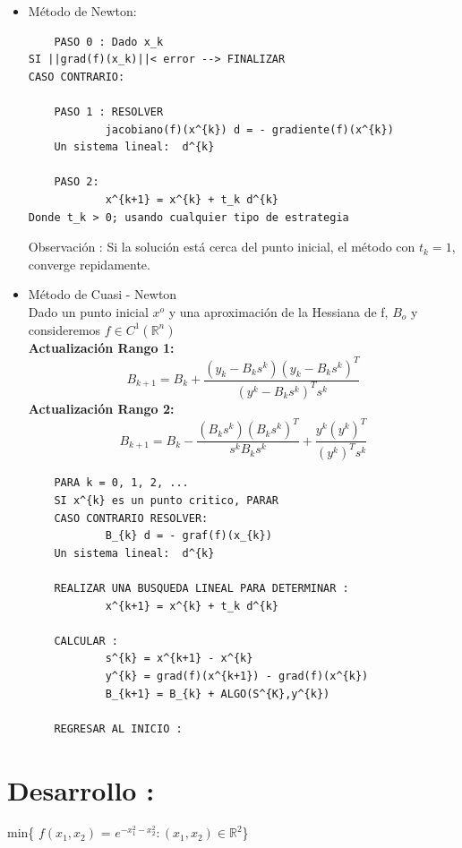 \documentclass[11pt]{article}
\begin{document}
\begin{itemize}
\item Método de Newton:

\begin{lstlisting}
    PASO 0 : Dado x_k
SI ||grad(f)(x_k)||< error --> FINALIZAR
CASO CONTRARIO:  

    PASO 1 : RESOLVER
            jacobiano(f)(x^{k}) d = - gradiente(f)(x^{k})
    Un sistema lineal:  d^{k}

    PASO 2: 
            x^{k+1} = x^{k} + t_k d^{k}
Donde t_k > 0; usando cualquier tipo de estrategia 
\end{lstlisting}
Observación : Si la solución está cerca del punto inicial, el método con $t_k = 1$, converge repidamente.

\item Método de Cuasi - Newton\\
Dado un punto inicial $x^o$ y una aproximación de la Hessiana de f, $B_o$ y consideremos $f \in C^{1}(\mathbb{R}^n)$ \\
\textbf{Actualización Rango 1:}
\[ B_{k+1} = B_{k} + \dfrac{(y_k - B_k s^k)(y_k - B_k s^k)^T}{(y^k - B_k s^k)^T s^k} \]
\textbf{Actualización Rango 2:}
\[ B_{k+1} = B_k - \dfrac{(B_k s^k)(B_k s^k)^T}{s^k B_k s^k} + \dfrac{y^k (y^k)^T}{(y^k)^T s^k}\]
\begin{lstlisting}
    PARA k = 0, 1, 2, ...
    SI x^{k} es un punto critico, PARAR
    CASO CONTRARIO RESOLVER:
            B_{k} d = - graf(f)(x_{k})
    Un sistema lineal:  d^{k}

    REALIZAR UNA BUSQUEDA LINEAL PARA DETERMINAR :
            x^{k+1} = x^{k} + t_k d^{k}

    CALCULAR : 
            s^{k} = x^{k+1} - x^{k}
            y^{k} = grad(f)(x^{k+1}) - grad(f)(x^{k})
            B_{k+1} = B_{k} + ALGO(S^{K},y^{k})

    REGRESAR AL INICIO : 
\end{lstlisting}



\end{itemize}

\section*{Desarrollo : }
\begin{center}
    min\{ $f(x_1,x_2)$ = $e^{-x_1^2-x_2^2} : (x_1,x_2) \in \mathbb{R}^2$\}
\end{center}
\end{document}
